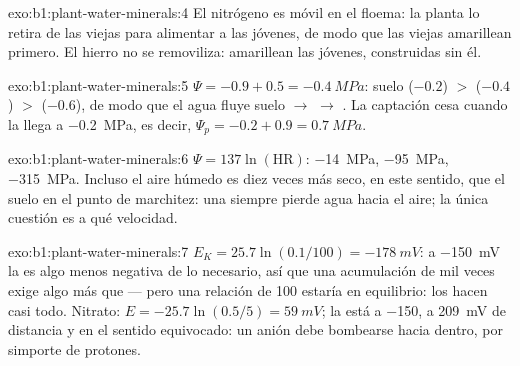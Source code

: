 \begin{solution}{exo:b1:plant-water-minerals:4}
El nitrógeno es móvil en el floema: la planta lo retira de las  viejas
para alimentar a las jóvenes, de modo que las viejas amarillean primero. El
hierro no se removiliza: amarillean las  jóvenes, construidas sin él.
\end{solution}

\begin{solution}{exo:b1:plant-water-minerals:5}
 $\Psi = -0.9 + 0.5 = \qty{-0.4}{MPa}$: suelo ($-0.2$) $>$ 
($-0.4$) $>$  ($-0.6$), de modo que el agua fluye suelo $\to$ 
$\to$ . La captación cesa cuando la  llega a \qty{-0.2}{MPa}, es
decir, $\Psi_p = -0.2 + 0.9 = \qty{0.7}{MPa}$.
\end{solution}

\begin{solution}{exo:b1:plant-water-minerals:6}
$\Psi = 137\ln(\text{HR})$: \qty{-14}{MPa}, \qty{-95}{MPa},
\qty{-315}{MPa}. Incluso el aire húmedo es diez veces más seco, en este
sentido, que el suelo en el punto de marchitez: una  siempre pierde agua
hacia el aire; la única cuestión es a qué velocidad.
\end{solution}

\begin{solution}{exo:b1:plant-water-minerals:7}
$E_K = 25.7\ln(0.1/100) = \qty{-178}{mV}$: a \qty{-150}{mV} la  es algo
menos negativa de lo necesario, así que una acumulación de mil veces exige
algo más que  --- pero una relación de 100 estaría en equilibrio: los
 hacen casi todo. Nitrato: $E = -25.7\ln(0.5/5)
= \qty{+59}{mV}$; la
 está a \qty{-150}{}, a \qty{209}{mV} de distancia y en el sentido
equivocado: un anión debe bombearse hacia dentro, por simporte de protones.
\end{solution}

